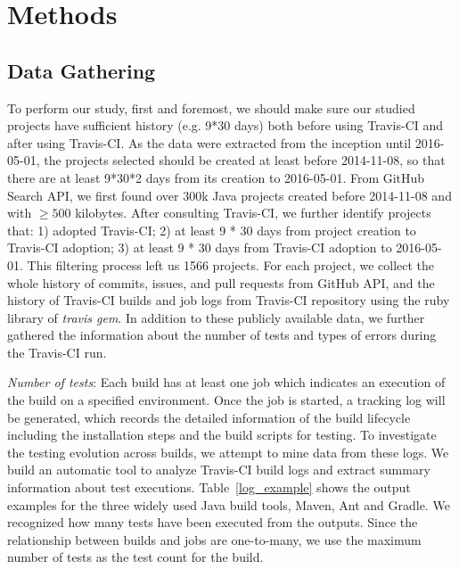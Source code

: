 
\section{Methods}
\label{sec:method}

\subsection{Data Gathering}

To perform our study, first and foremost, we should make sure our studied projects have sufficient history (e.g. 9*30 days) both before using Travis-CI and after using Travis-CI.  As the data were extracted from the inception until 2016-05-01, the projects selected should be created at least before 2014-11-08, so that there are at least 9*30*2 days from its creation to 2016-05-01. 
From GitHub Search API, we first found over 300k Java projects created before 2014-11-08 and with $\geqslant 500$ kilobytes. After consulting Travis-CI, we further identify projects that: 1) adopted Travis-CI; 2) at least 9 * 30 days from project creation to Travis-CI adoption; 3) at least 9 * 30 days from Travis-CI adoption to 2016-05-01. This filtering process left us 1566 projects.  
For each project, we collect the whole history of commits, issues, and pull requests from GitHub API, and the history of Travis-CI builds and job logs from Travis-CI repository using the ruby library of \textit{travis gem}.  In addition to these publicly available data, we further gathered the information about the number of tests and types of errors during the Travis-CI run.


\emph{Number of tests}: 
Each build has at least one job which indicates an execution of the build on a specified environment. Once the job is started, a tracking log will be generated, which records the detailed information of the build lifecycle including the installation steps and the build scripts for testing. To investigate the testing evolution across builds, we attempt to mine data from these logs. We build an automatic tool to analyze Travis-CI build logs and extract summary information about test executions. Table~\ref{log_example} shows the output examples for the three widely used Java build tools, \ie Maven, Ant and Gradle. We recognized how many tests have been executed from the outputs. Since the relationship between builds and jobs are one-to-many, we use the maximum number of tests as the test count for the build. 

